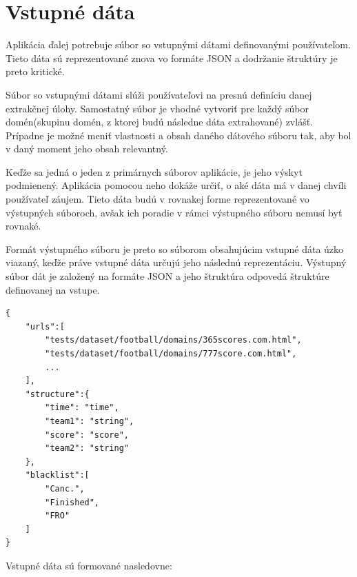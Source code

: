 \section{Vstupné dáta}

Aplikácia ďalej potrebuje súbor so vstupnými dátami definovanými používateľom. Tieto dáta sú reprezentované znova vo formáte JSON a dodržanie štruktúry je preto kritické. 

Súbor so vstupnými dátami slúži používateľovi na presnú definíciu danej extrakčnej úlohy. Samostatný súbor je vhodné vytvoriť pre každý súbor domén(skupinu domén, z ktorej budú následne dáta extrahované) zvlášť. Prípadne je možné meniť vlastnosti a obsah daného dátového súboru tak, aby bol v daný moment jeho obsah relevantný. 

Keďže sa jedná o jeden z primárnych súborov aplikácie, je jeho výskyt podmienený. Aplikácia pomocou neho dokáže určiť, o aké dáta má v danej chvíli používateľ záujem. Tieto dáta budú v rovnakej forme reprezentované vo výstupných súboroch, avšak ich poradie v rámci výstupného súboru nemusí byť rovnaké.

Formát výstupného súboru je preto so súborom obsahujúcim vstupné dáta úzko viazaný, keďže práve vstupné dáta určujú jeho následnú reprezentáciu. Výstupný súbor dát je založený na formáte JSON a jeho štruktúra odpovedá štruktúre definovanej na vstupe.

\bigskip

\begin{lstlisting}[caption={Príklad súboru so vstupnými dátami},captionpos=b,label={data_ex}]
{
    "urls":[
        "tests/dataset/football/domains/365scores.com.html",
        "tests/dataset/football/domains/777score.com.html",
        ...
    ],
    "structure":{
        "time": "time",
        "team1": "string",
        "score": "score",
        "team2": "string"
    },
    "blacklist":[
        "Canc.",
        "Finished",
        "FRO"
    ]
}
\end{lstlisting}

\bigskip

Vstupné dáta sú formované nasledovne:

